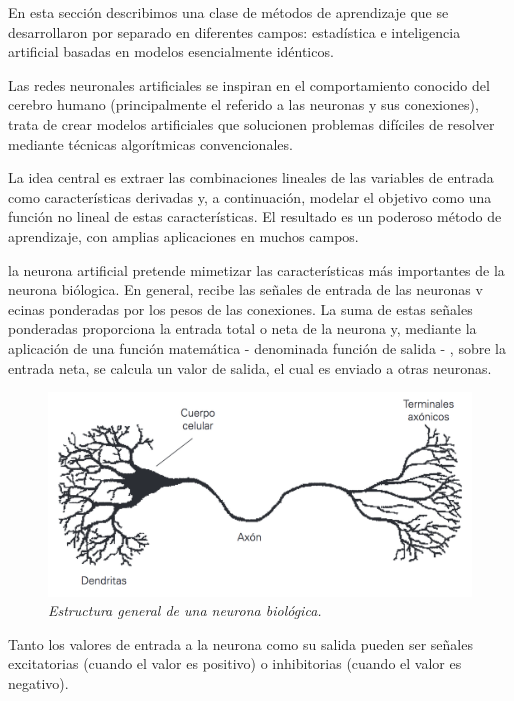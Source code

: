 \documentclass[]{book}
\begin{document}
En esta sección describimos una clase de métodos de aprendizaje que se
desarrollaron por separado en diferentes campos: estadística e
inteligencia artificial basadas en modelos esencialmente idénticos.

Las redes neuronales artificiales se inspiran en el comportamiento
conocido del cerebro humano (principalmente el referido a las neuronas y
sus conexiones), trata de crear modelos artificiales que solucionen
problemas difíciles de resolver mediante técnicas algorítmicas
convencionales.

La idea central es extraer las combinaciones lineales de las variables
de entrada como características derivadas y, a continuación, modelar el
objetivo como una función no lineal de estas características. El
resultado es un poderoso método de aprendizaje, con amplias aplicaciones
en muchos campos.

la neurona artificial pretende mimetizar las características más
importantes de la neurona biólogica. En general, recibe las señales de
entrada de las neuronas v ecinas ponderadas por los pesos de las
conexiones. La suma de estas señales ponderadas proporciona la entrada
total o neta de la neurona y, mediante la aplicación de una función
matemática - denominada función de salida - , sobre la entrada neta, se
calcula un valor de salida, el cual es enviado a otras neuronas.

\begin{figure}
\centering
\includegraphics{figures/neurona.png}
\caption{\emph{Estructura general de una neurona biológica.}}
\end{figure}

Tanto los valores de entrada a la neurona como su salida pueden ser
señales excitatorias (cuando el valor es positivo) o inhibitorias
(cuando el valor es negativo).
\end{document}

